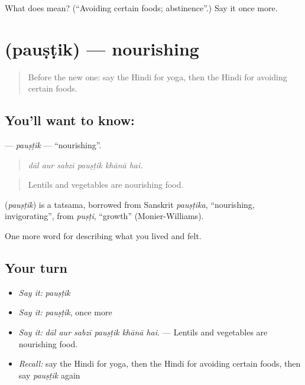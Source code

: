 \begin{tcolorbox}[breakable,colback=teal!4,colframe=teal!35!black,title={Before you move on}]
What does  mean? (\textquotedblleft{}Avoiding certain foods; abstinence\textquotedblright{}.) Say it once more.
\end{tcolorbox}
\section[\texorpdfstring{\hi{पौष्टिक} (pauṣṭik)}{पौष्टिक (pauṣṭik)}]{ (pauṣṭik) — nourishing}

\label{lesson:HI-C495-paustik}



\begin{quote}
Before the new one: say the Hindi for yoga, then the Hindi for avoiding certain foods.
\end{quote}

\subsection*{You'll want to know: }
\textbf{} — \emph{pauṣṭik} — \textquotedblleft{}nourishing\textquotedblright{}.

\begin{quote}
     
\end{quote}

\begin{quote}
\emph{dāl aur sabzī pauṣṭik khānā hai.}
\end{quote}

\begin{quote}
Lentils and vegetables are nourishing food.
\end{quote}

\begin{cousinweb}
\textbf{} (\emph{pauṣṭik}) is a tatsama, borrowed from Sanskrit \emph{pauṣṭika}, \textquotedblleft{}nourishing, invigorating\textquotedblright{}, from \emph{puṣṭi}, \textquotedblleft{}growth\textquotedblright{} (Monier-Williams).
\end{cousinweb}

\begin{grammarlens}[title={What you've built}]
One more word for describing what you lived and felt.
\end{grammarlens}

\subsection*{Your turn}
\begin{itemize}
\raggedright
  \item \emph{Say it:} \emph{pauṣṭik}
  \item \emph{Say it:} \emph{pauṣṭik}, once more
  \item \emph{Say it:} \emph{dāl aur sabzī pauṣṭik khānā hai.} — Lentils and vegetables are nourishing food.
  \item \emph{Recall:} say the Hindi for yoga, then the Hindi for avoiding certain foods, then say \emph{pauṣṭik} again
\end{itemize}

